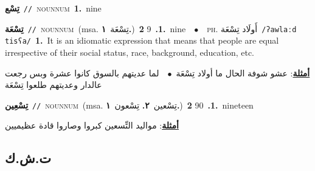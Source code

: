 \documentclass[10pt,a4paper,twoside]{article} %
\begin{document}
\begin{multicols}{2}
{\setlength\topsep{0pt}\textbf{\foreignlanguage{arabic}{تِسْع}}\ {\color{gray}\texttt{//}\color{black}}\ \textsc{noun\textunderscore num}\ \textbf{1.}~nine\ } \vspace{2mm}

{\setlength\topsep{0pt}\textbf{\foreignlanguage{arabic}{تِسْعَة}}\ {\color{gray}\texttt{//}\color{black}}\ \textsc{noun\textunderscore num}\ \color{gray}(msa. \foreignlanguage{arabic}{تِسْعَة}~\foreignlanguage{arabic}{\textbf{١.}})\color{black}\ \textbf{1.}~9  \textbf{2.}~nine\ \ $\bullet$\ \ \textsc{ph.} \color{gray} \foreignlanguage{arabic}{أَولَاد تِسْعَة}\color{black}\ {\color{gray}\texttt{/{\sffamily ʔawlaːd tisʕa}/}\color{black}}\ \textbf{1.}~It is an idiomatic expression that means that people are equal irrespective of their social status, race, background, education, etc.\  \begin{flushright}\color{gray}\foreignlanguage{arabic}{\textbf{\underline{\foreignlanguage{arabic}{أمثلة}}}: عشو شوفة الحال ما أولاد تِسْعَة\ $\bullet$\ \  لما عديتهم بالسوق كانوا عشرة وبس رجعت عالدار وعديتهم طلعوا تِسْعَة}\end{flushright}\color{black}} \vspace{2mm}

{\setlength\topsep{0pt}\textbf{\foreignlanguage{arabic}{تِسْعِين}}\ {\color{gray}\texttt{//}\color{black}}\ \textsc{noun\textunderscore num}\ \color{gray}(msa. \foreignlanguage{arabic}{تِسْعين}~\foreignlanguage{arabic}{\textbf{٢.}}  \foreignlanguage{arabic}{تِسْعون}~\foreignlanguage{arabic}{\textbf{١.}})\color{black}\ \textbf{1.}~90  \textbf{2.}~nineteen\  \begin{flushright}\color{gray}\foreignlanguage{arabic}{\textbf{\underline{\foreignlanguage{arabic}{أمثلة}}}: مواليد التِّسعين كبروا وصاروا قادة عظيميين}\end{flushright}\color{black}} \vspace{2mm}

\vspace{-3mm}
\subsection*{\color{blue}\foreignlanguage{arabic}{ت.ش.ك}\color{blue}{ (ntws)}} 


\end{multicols}
\end{document}
